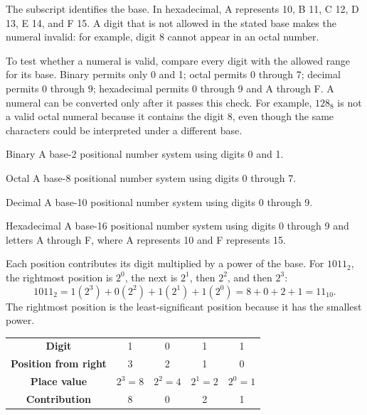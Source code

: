 The subscript identifies the base. In hexadecimal, A represents 10, B 11,
C 12, D 13, E 14, and F 15. A digit that is not allowed in the stated base
makes the numeral invalid: for example, digit 8 cannot appear in an octal
number.

To test whether a numeral is valid, compare every digit with the allowed
range for its base. Binary permits only 0 and 1; octal permits 0 through 7;
decimal permits 0 through 9; hexadecimal permits 0 through 9 and A through
F. A numeral can be converted only after it passes this check. For example,
$128_8$ is not a valid octal numeral because it contains the digit 8, even
though the same characters could be interpreted under a different base.

\begin{definitionbox}{Binary}
A base-2 positional number system using digits 0 and 1.
\end{definitionbox}

\begin{definitionbox}{Octal}
A base-8 positional number system using digits 0 through 7.
\end{definitionbox}

\begin{definitionbox}{Decimal}
A base-10 positional number system using digits 0 through 9.
\end{definitionbox}

\begin{definitionbox}{Hexadecimal}
A base-16 positional number system using digits 0 through 9 and letters A
through F, where A represents 10 and F represents 15.
\end{definitionbox}

Each position contributes its digit multiplied by a power of the base. For
$1011_2$, the rightmost position is $2^0$, the next is $2^1$, then $2^2$,
and then $2^3$:
\[
1011_2=1(2^3)+0(2^2)+1(2^1)+1(2^0)=8+0+2+1=11_{10}.
\]
The rightmost position is the least-significant position because it has the
smallest power.

\begin{center}
\begin{tabular}{ccccc}
\toprule
\textbf{Digit} & 1 & 0 & 1 & 1\\
\textbf{Position from right} & 3 & 2 & 1 & 0\\
\textbf{Place value} & $2^3=8$ & $2^2=4$ & $2^1=2$ & $2^0=1$\\
\textbf{Contribution} & 8 & 0 & 2 & 1\\
\bottomrule
\end{tabular}
\end{center}

